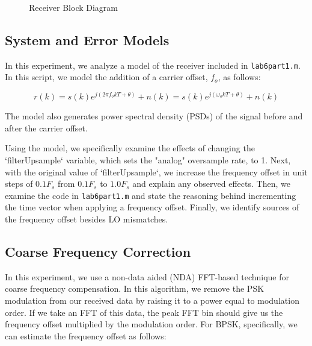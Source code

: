 \documentclass{article}
\begin{document}
\begin{figure}[H]
	\centerline{}
	\caption{Receiver Block Diagram}
	\label{fig::receiver_block_diagram}
\end{figure}

\subsection{System and Error Models}

In this experiment, we analyze a model of the receiver included in \texttt{lab6part1.m}. In this script, we model the addition of a carrier offset, $f_o$, as follows:

\begin{equation}
	\label{eq::carrier_freq_offset}
	r(k) = s(k)e^{j(2{\pi}f_okT+\theta)}+n(k) = s(k)e^{j(\omega_okT+\theta)}+n(k)
\end{equation}

\noindent The model also generates power spectral density (PSDs) of the signal before and after the carrier offset.

Using the model, we specifically examine the effects of changing the `filterUpsample` variable, which sets the "analog" oversample rate, to 1. Next, with the original value of `filterUpsample`, we increase the frequency offset in unit steps of $0.1F_s$ from $0.1F_s$ to $1.0F_s$ and explain any observed effects. Then, we examine the code in \texttt{lab6part1.m} and state the reasoning behind incrementing the time vector when applying a frequency offset. Finally, we identify sources of the frequency offset besides LO mismatches.

\subsection{Coarse Frequency Correction}

In this experiment, we use a non-data aided (NDA) FFT-based technique for coarse frequency compensation. In this algorithm, we remove the PSK modulation from our received data by raising it to a power equal to modulation order. If we take an FFT of this data, the peak FFT bin should give us the frequency offset multiplied by the modulation order. For BPSK, specifically, we can estimate the frequency offset as follows:
\end{document}
